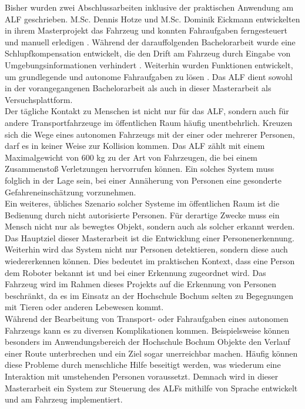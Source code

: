 		Bisher wurden zwei Abschlussarbeiten inklusive der praktischen Anwendung am ALF geschrieben. M.Sc. Dennis Hotze und M.Sc. Dominik Eickmann entwickelten in ihrem Masterprojekt das Fahrzeug und konnten Fahraufgaben ferngesteuert und manuell erledigen \cite{alf}. Während der darauffolgenden Bachelorarbeit wurde eine Schlupfkompensation entwickelt, die den Drift am Fahrzeug durch Eingabe von Umgebungsinformationen verhindert \cite{Bachelorarbeit}. Weiterhin wurden Funktionen entwickelt, um grundlegende und autonome Fahraufgaben zu lösen \cite{Bachelorarbeit}. Das ALF dient sowohl in der vorangegangenen Bachelorarbeit als auch in dieser Masterarbeit als Versuchsplattform.\\
		
		Der tägliche Kontakt zu Menschen ist nicht nur für das ALF, sondern auch für andere Transportfahrzeuge im öffentlichen Raum häufig unentbehrlich. Kreuzen sich die Wege eines autonomen Fahrzeugs mit der einer oder mehrerer Personen, darf es in keiner Weise zur Kollision kommen. Das ALF zählt mit einem Maximalgewicht von 600 kg zu der Art von Fahrzeugen, die bei einem Zusammenstoß Verletzungen hervorrufen können. Ein solches System muss folglich in der Lage sein, bei einer Annäherung von Personen eine gesonderte Gefahreneinschätzung vorzunehmen.\\
				
		Ein weiteres, übliches Szenario solcher Systeme im öffentlichen Raum ist die Bedienung durch nicht autorisierte Personen. Für derartige Zwecke muss ein Mensch nicht nur als bewegtes Objekt, sondern auch als solcher erkannt werden. Das Hauptziel dieser Masterarbeit ist die Entwicklung einer Personenerkennung.\\
		
		Weiterhin wird das System nicht nur Personen detektieren, sondern diese auch wiedererkennen können. Dies bedeutet im praktischen Kontext, dass eine Person dem Roboter bekannt ist und bei einer Erkennung zugeordnet wird. Das Fahrzeug wird im Rahmen dieses Projekts auf die Erkennung von Personen beschränkt, da es im Einsatz an der Hochschule Bochum selten zu Begegnungen mit Tieren oder anderen Lebewesen kommt.\\
				
		Während der Bearbeitung von Transport- oder Fahraufgaben eines autonomen Fahrzeugs kann es zu diversen Komplikationen kommen. Beispielsweise können besonders im Anwendungsbereich der Hochschule Bochum Objekte den Verlauf einer Route unterbrechen und ein Ziel sogar unerreichbar machen. Häufig können diese Probleme durch menschliche Hilfe beseitigt werden, was wiederum eine Interaktion mit umstehenden Personen voraussetzt. Demnach wird in dieser Masterarbeit ein System zur Steuerung des ALFs mithilfe von Sprache entwickelt und am Fahrzeug implementiert.\\
		
